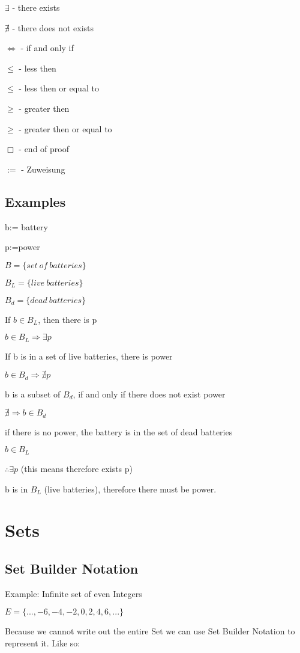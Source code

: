 \documentclass{article}
\begin{document}
$\exists$ - there exists

$\nexists$ - there does not exists

$\iff$ - if and only if

$\le$ - less then

$\leq$ - less then or equal to

$\ge$ - greater then

$\geq$ - greater then or equal to

$\Box$ - end of proof

$:=$ - Zuweisung

\subsection*{Examples}

b:= battery  

p:=power

$B=\{set\ of\ batteries\}$

$B_L=\{live\ batteries\}$

$B_d=\{dead\ batteries\}$

If $ b \in B_L $, then there is p

$ b \in B_L \Rightarrow \exists p $

If b is in a set of live batteries, there is power

$ b \in B_d \Rightarrow \nexists p $

b is a subset of $B_d$, if and only if there does not exist power

$\nexists \Rightarrow b \in B_d$

if there is no power, the battery is in the set of dead batteries

$b \in B_L$

$\therefore \exists p$  (this means therefore exists p)

b is in $B_L$ (live batteries), therefore there must be power.

\section{Sets}
\subsection{Set Builder Notation}

Example: Infinite set of even Integers

$E=\{..., -6, -4, -2, 0, 2, 4, 6, ...\}$

Because we cannot write out the entire Set we can use Set Builder Notation
to represent it.
Like so:
\end{document}
